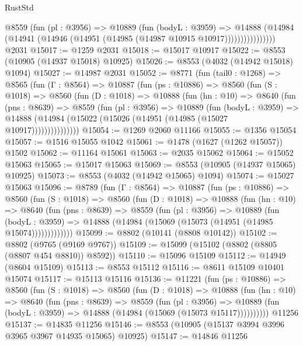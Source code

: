 \begin{lexlean}{RustStd}
\begin{coremodule}
                  @8559
                    (fun (pl : @3956) =>
                    @10889
                      (fun (bodyL : @3959) =>
                      @14888
                        (@14984
                          (@14941 (@14946 (@14951 (@14985 (@14987 @10915 @10917))))))))))))))))
    @2031
@15017 := @1259 @2031
@15018 := @15017 @10917
@15022 := @8553 (@10905 (@14937 @15018) @10925)
@15026 := @8553 (@4032 (@14942 @15018) @1094)
@15027 := @14987 @2031
@15052 := @8771
    (fun (tail0 : @1268) =>
    @8565
      (fun (Γ : @8564) =>
      @10887
        (fun (ps : @10886) =>
        @8560
          (fun (S : @1018) =>
          @8560
            (fun (D : @1018) =>
            @10888
              (fun (hn : @10) =>
              @8640
                (fun (pns : @8639) =>
                @8559
                  (fun (pl : @3956) =>
                  @10889
                    (fun (bodyL : @3959) =>
                    @14888 (@14984 (@15022 (@15026 (@14951 (@14985 (@15027 @10917)))))))))))))))
@15054 := @1269 @2060 @11166
@15055 := @1356 @15054
@15057 := @1516 @15055 @1042
@15061 := @1478 (@1627 (@1262 @15057)) @1502
@15062 := @11164 @15061
@15063 := @2035 @15062
@15064 := @15052 @15063
@15065 := @15017 @15063
@15069 := @8553 (@10905 (@14937 @15065) @10925)
@15073 := @8553 (@4032 (@14942 @15065) @1094)
@15074 := @15027 @15063
@15096 := @8789
    (fun (Γ : @8564) =>
    @10887
      (fun (ps : @10886) =>
      @8560
        (fun (S : @1018) =>
        @8560
          (fun (D : @1018) =>
          @10888
            (fun (hn : @10) =>
            @8640
              (fun (pns : @8639) =>
              @8559
                (fun (pl : @3956) =>
                @10889
                  (fun (bodyL : @3959) =>
                  @14888 (@14984 (@15069 (@15073 (@14951 (@14985 @15074)))))))))))))
@15099 := @8802 (@10141 (@8808 @10142))
@15102 := @8802 (@9765 (@9169 @9767))
@15109 := @15099 (@15102 (@8802 (@8805 (@8807 @454 @8810)) @8592))
@15110 := @15096 @15109
@15112 := @14949 (@8604 @15109)
@15113 := @8553 @15112
@15116 := @8611 @15109 @10401 @15074
@15117 := @15113 @15116
@15136 := @11221
    (fun (ps : @10886) =>
    @8560
      (fun (S : @1018) =>
      @8560
        (fun (D : @1018) =>
        @10888
          (fun (hn : @10) =>
          @8640
            (fun (pns : @8639) =>
            @8559
              (fun (pl : @3956) =>
              @10889 (fun (bodyL : @3959) => @14888 (@14984 (@15069 (@15073 @15117))))))))))
    @11256
@15137 := @14835 @11256
@15146 := @8553 (@10905 (@15137 @3994 @3996 @3965 @3967 @14935 @15065) @10925)
@15147 := @14846 @11256

\end{coremodule}
\end{lexlean}

